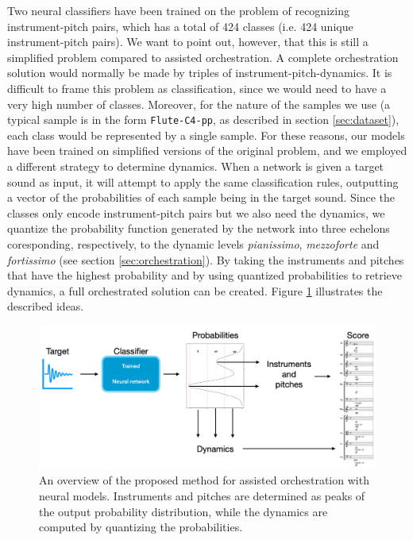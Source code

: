 \documentclass[runningheads,a4paper]{llncs}
\begin{document}
Two neural classifiers have been trained on the problem of recognizing instrument-pitch pairs, which has a total of 424 classes (i.e. 424 unique instrument-pitch pairs). We want to point out, however, that this is still a simplified problem compared to assisted orchestration. A complete orchestration solution would normally be made by triples of instrument-pitch-dynamics. It is difficult to frame this problem as classification, since we would need to have a very high number of classes. Moreover, for the nature of the samples we use (a typical sample is in the form \texttt{Flute-C4-pp}, as described in section \ref{sec:dataset}), each class would be represented by a single sample. For these reasons, our models have been trained on simplified versions of the original problem, and we employed a different strategy to determine dynamics. When a network is given a target sound as input, it will attempt to apply the same classification rules, outputting a vector of the probabilities of each sample being in the target sound. Since the classes only encode instrument-pitch pairs but we also need the dynamics, we quantize the probability function generated by the network into three echelons coresponding, respectively, to the dynamic levels \emph{pianissimo}, \emph{mezzoforte} and \emph{fortissimo} (see section \ref{sec:orchestration}). By taking the instruments and pitches that have the highest probability and by using quantized probabilities to retrieve dynamics, a full orchestrated solution can be created.  Figure \ref{fig:method} illustrates the described ideas.

\begin{figure}
	\centering
	\includegraphics[scale=0.20]{../ISMIR_2020/figs/method.png}
	\caption{An overview of the proposed method for assisted orchestration with neural models. Instruments and pitches are determined as peaks of the output probability distribution, while the dynamics are computed by quantizing the probabilities. \label{fig:method}}
\end{figure}
\end{document}
